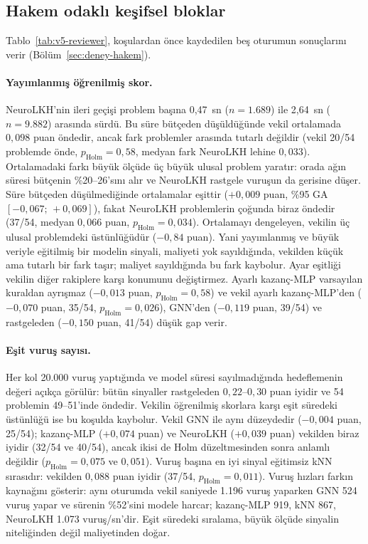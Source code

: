 

\subsection{Hakem odaklı keşifsel bloklar}\label{sec:bulgular-hakem}

Tablo~\ref{tab:v5-reviewer}, koşulardan önce kaydedilen beş oturumun sonuçlarını verir
(Bölüm~\ref{sec:deney-hakem}).

\paragraph{Yayımlanmış öğrenilmiş skor.}
NeuroLKH'nin ileri geçişi problem başına 0,47~sn ($n=1.689$) ile 2,64~sn ($n=9.882$) arasında
sürdü. Bu süre bütçeden düşüldüğünde vekil ortalamada $0{,}098$ puan öndedir, ancak fark problemler
arasında tutarlı değildir (vekil 20/54 problemde önde, $p_{\mathrm{Holm}}=0{,}58$, medyan fark
NeuroLKH lehine $0{,}033$). Ortalamadaki farkı büyük ölçüde üç büyük ulusal problem yaratır: orada
ağın süresi bütçenin \%20--26'sını alır ve NeuroLKH rastgele vuruşun da gerisine düşer.
Süre bütçeden düşülmediğinde ortalamalar eşittir ($+0{,}009$ puan, \%95 GA $[-0{,}067;\,+0{,}069]$),
fakat NeuroLKH problemlerin çoğunda biraz öndedir (37/54, medyan $0{,}066$ puan,
$p_{\mathrm{Holm}}=0{,}034$). Ortalamayı dengeleyen, vekilin üç ulusal problemdeki üstünlüğüdür
($-0{,}84$ puan). Yani yayımlanmış ve büyük veriyle eğitilmiş bir modelin sinyali, maliyeti
yok sayıldığında, vekilden küçük ama tutarlı bir fark taşır; maliyet sayıldığında bu fark kaybolur.
Ayar eşitliği vekilin diğer rakiplere karşı konumunu değiştirmez. Ayarlı kazanç-MLP varsayılan
kuraldan ayrışmaz ($-0{,}013$ puan, $p_{\mathrm{Holm}}=0{,}58$) ve vekil ayarlı kazanç-MLP'den
($-0{,}070$ puan, 35/54, $p_{\mathrm{Holm}}=0{,}026$), GNN'den ($-0{,}119$ puan, 39/54) ve
rastgeleden ($-0{,}150$ puan, 41/54) düşük gap verir.

\paragraph{Eşit vuruş sayısı.}
Her kol 20.000 vuruş yaptığında ve model süresi sayılmadığında hedeflemenin değeri açıkça görülür:
bütün sinyaller rastgeleden $0{,}22$--$0{,}30$ puan iyidir ve 54 problemin 49--51'inde öndedir.
Vekilin öğrenilmiş skorlara karşı eşit süredeki üstünlüğü ise bu koşulda kaybolur. Vekil GNN ile
aynı düzeydedir ($-0{,}004$ puan, 25/54); kazanç-MLP ($+0{,}074$ puan) ve NeuroLKH ($+0{,}039$ puan)
vekilden biraz iyidir (32/54 ve 40/54), ancak ikisi de Holm düzeltmesinden sonra anlamlı değildir
($p_{\mathrm{Holm}}=0{,}075$ ve $0{,}051$). Vuruş başına en iyi sinyal eğitimsiz kNN sırasıdır: vekilden
$0{,}088$ puan iyidir (37/54, $p_{\mathrm{Holm}}=0{,}011$).
Vuruş hızları farkın kaynağını gösterir: aynı oturumda vekil saniyede 1.196 vuruş yaparken GNN 524
vuruş yapar ve sürenin \%52'sini modele harcar; kazanç-MLP 919, kNN 867, NeuroLKH 1.073 vuruş/sn'dir.
Eşit süredeki sıralama, büyük ölçüde sinyalin niteliğinden değil maliyetinden doğar.

